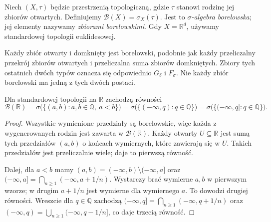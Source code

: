 \begin{definicja}
\label{def:borel}
Niech $(X,\tau)$ będzie przestrzenią topologiczną, gdzie $\tau$
stanowi rodzinę jej zbiorów otwartych. Definiujemy
$\mathcal B(X)=\sigma_X(\tau)$.
Jest to \emph{$\sigma$-algebra borelowska}; jej elementy nazywamy
\emph{zbiorami borelowskimi}. Gdy $X=\mathbb R^d$, używamy standardowej
topologii euklidesowej.
\end{definicja}

Każdy zbiór otwarty i domknięty jest borelowski, podobnie jak każdy
przeliczalny przekrój zbiorów otwartych i przeliczalna suma zbiorów
domkniętych. Zbiory tych ostatnich dwóch typów oznacza się odpowiednio
$G_\delta$ i $F_\sigma$. Nie każdy zbiór borelowski ma jedną z tych
dwóch postaci.

\begin{twierdzenie}
\label{thm:borel-generators-R}
Dla standardowej topologii na $\mathbb R$ zachodzą równości
\[
\mathcal B(\mathbb R)
=\sigma\bigl(\{(a,b):a,b\in\mathbb Q,\ a<b\}\bigr)
=\sigma\bigl(\{(-\infty,q):q\in\mathbb Q\}\bigr)
=\sigma\bigl(\{(-\infty,q]:q\in\mathbb Q\}\bigr).
\]
\end{twierdzenie}
\begin{proof}
Wszystkie wymienione przedziały są borelowskie, więc każda z
wygenerowanych rodzin jest zawarta w $\mathcal B(\mathbb R)$.
Każdy otwarty $U\subseteq\mathbb R$ jest sumą tych przedziałów
$(a,b)$ o końcach wymiernych, które zawierają się w $U$. Takich
przedziałów jest przeliczalnie wiele; daje to pierwszą równość.

Dalej, dla $a<b$ mamy $(a,b)=(-\infty,b)\setminus(-\infty,a]$ oraz
$(-\infty,a]=\bigcap_{n\geq1}(-\infty,a+1/n)$.
Wystarczy brać wymierne $a,b$ w pierwszym wzorze; w drugim
$a+1/n$ jest wymierne dla wymiernego $a$. To dowodzi drugiej
równości. Wreszcie dla $q\in\mathbb Q$ zachodzą
$(-\infty,q]=\bigcap_{n\geq1}(-\infty,q+1/n)$ oraz
$(-\infty,q)=\bigcup_{n\geq1}(-\infty,q-1/n]$,
co daje trzecią równość.
\end{proof}

